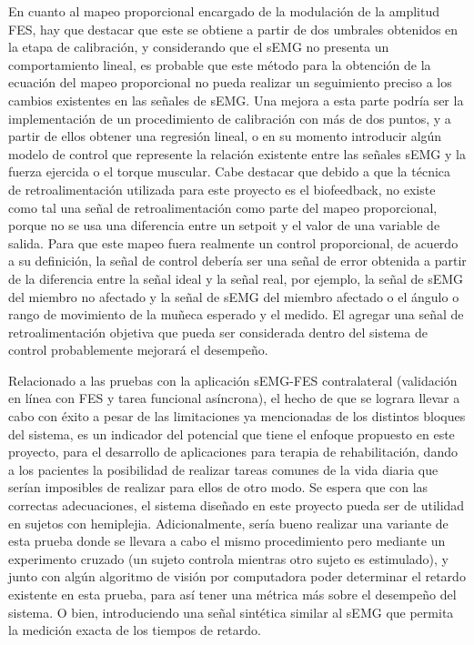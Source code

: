 En cuanto al mapeo proporcional encargado de la modulación de la amplitud FES, hay que destacar que este se obtiene a partir de dos umbrales obtenidos en la etapa de calibración, y considerando que el sEMG no presenta un comportamiento lineal, es probable que este método para la obtención de la ecuación del mapeo proporcional no pueda realizar un seguimiento preciso a los cambios existentes en las señales de sEMG. Una mejora a esta parte podría ser la implementación de un procedimiento de calibración con más de dos puntos, y a partir de ellos obtener una regresión lineal, o en su momento introducir algún modelo de control que represente la relación existente entre las señales sEMG y la fuerza ejercida o el torque muscular. Cabe destacar que debido a que la técnica de retroalimentación utilizada para este proyecto es el biofeedback, no existe como tal una señal de retroalimentación como parte del mapeo proporcional, porque no se usa una diferencia entre un setpoit y el valor de una variable de salida. Para que este mapeo fuera realmente un control proporcional, de acuerdo a su definición, la señal de control debería ser una señal de error obtenida a partir de la diferencia entre la señal ideal y la señal real, por ejemplo, la señal de sEMG del miembro no afectado y la señal de sEMG del miembro afectado o el ángulo o rango de movimiento de la muñeca esperado y el medido. El agregar una señal de retroalimentación objetiva que pueda ser considerada dentro del sistema de control probablemente mejorará el desempeño.

Relacionado a las pruebas con la aplicación sEMG-FES contralateral (validación en línea con FES y tarea funcional asíncrona), el hecho de que se lograra llevar a cabo con éxito a pesar de las limitaciones ya mencionadas de los distintos bloques del sistema, es un indicador del potencial que tiene el enfoque propuesto en este proyecto, para el desarrollo de aplicaciones para terapia de rehabilitación, dando a los pacientes la posibilidad de realizar tareas comunes de la vida diaria que serían imposibles de realizar para ellos de otro modo. Se espera que con las correctas adecuaciones, el sistema diseñado en este proyecto pueda ser de utilidad en sujetos con hemiplejia. Adicionalmente, sería bueno realizar una variante de esta prueba donde se llevara a cabo el mismo procedimiento pero mediante un experimento cruzado (un sujeto controla mientras otro sujeto es estimulado), y junto con algún algoritmo de visión por computadora poder determinar el retardo existente en esta prueba, para así tener una métrica más sobre el desempeño del sistema. O bien, introduciendo una señal sintética similar al sEMG que permita la medición exacta de los tiempos de retardo.


